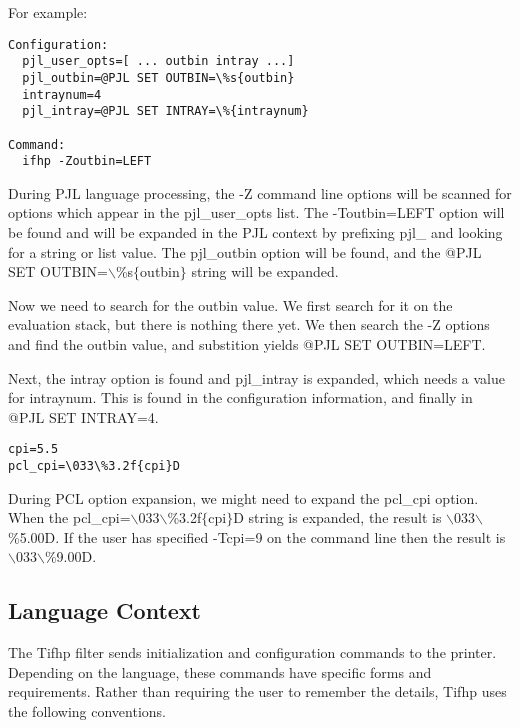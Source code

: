 \documentclass[a4paper]{article}
\begin{document}
For example:
\begin{tscreen}
\begin{verbatim}
Configuration:
  pjl_user_opts=[ ... outbin intray ...]
  pjl_outbin=@PJL SET OUTBIN=\%s{outbin}
  intraynum=4
  pjl_intray=@PJL SET INTRAY=\%{intraynum}

Command:
  ifhp -Zoutbin=LEFT
\end{verbatim}
\end{tscreen}


During PJL language processing,
the 
{\ttfamily -Z}
command line options
will be scanned for options which appear in the
{\ttfamily pjl\_user\_opts}
list.
The
{\ttfamily -Toutbin=LEFT}
option will be found and will be expanded in the PJL context
by prefixing
{\ttfamily pjl\_}
and looking for a string or list value.
The
{\ttfamily pjl\_outbin}
option will be found,
and the
{\ttfamily @PJL SET OUTBIN=$\backslash$\%s$\{$outbin$\}$}
string will be expanded.

Now we need to search for the
{\ttfamily outbin}
value.
We first search for it on the evaluation stack,
but there is nothing there yet.
We then search the
{\ttfamily -Z}
options and find the
{\ttfamily outbin}
value,
and substition yields
{\ttfamily @PJL SET OUTBIN=LEFT}.

Next, the
{\ttfamily intray}
option is found and
{\ttfamily pjl\_intray}
is expanded,
which needs a value for
{\ttfamily intraynum}.
This is found in the configuration information,
and finally in
{\ttfamily @PJL SET INTRAY=4}.
\begin{tscreen}
\begin{verbatim}
cpi=5.5
pcl_cpi=\033\%3.2f{cpi}D
\end{verbatim}
\end{tscreen}


During PCL option expansion,
we might need to expand the
{\ttfamily pcl\_cpi}
option.
When the
{\ttfamily pcl\_cpi=$\backslash$033$\backslash$\%3.2f$\{$cpi$\}$D}
string is expanded,
the result is
{\ttfamily $\backslash$033$\backslash$\%5.00D}.
If the user has specified
{\ttfamily -Tcpi=9}
on the command line then the result is
{\ttfamily $\backslash$033$\backslash$\%9.00D}.


\subsection{Language Context}

The Tifhp filter sends initialization and configuration commands to the
printer.
Depending on the language,
these commands have specific forms and requirements.
Rather than requiring the user to remember the details, Tifhp uses the following conventions.
\end{document}
